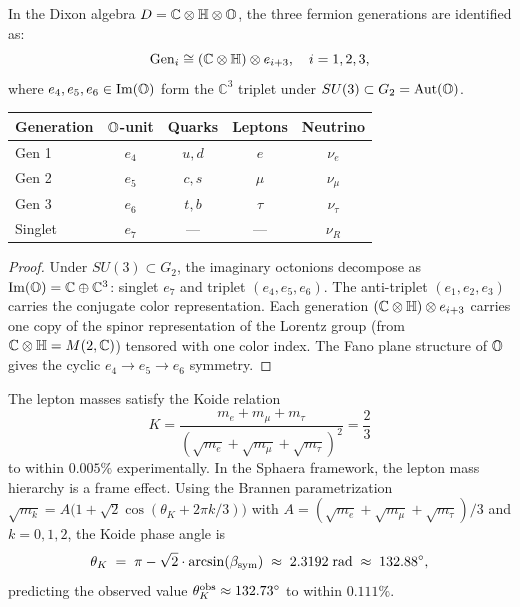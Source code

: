 \begin{theorem}
\label{thm:three-generations}
In the Dixon algebra $D=\mathbb{C}\otimes\mathbb{H}\otimes\mathbb{O}$, the three
fermion generations are identified as:
\[
  \mathrm{Gen}_i \cong (\mathbb{C}\otimes\mathbb{H})\otimes e_{i+3},
  \quad i=1,2,3,
\]
where $e_4,e_5,e_6\in\mathrm{Im}(\mathbb{O})$ form the $\mathbb{C}^3$ triplet
under $SU(3)\subset G_2=\mathrm{Aut}(\mathbb{O})$.
\begin{center}
\renewcommand{\arraystretch}{1.2}
{\small\setlength{\tabcolsep}{4pt}\begin{tabular}{@{}p{}cccc@{}}
\toprule
Generation & $\mathbb{O}$-unit & Quarks & Leptons & Neutrino\\
\midrule
Gen 1 & $e_4$ & $u,d$ & $e$ & $\nu_e$\\
Gen 2 & $e_5$ & $c,s$ & $\mu$ & $\nu_\mu$\\
Gen 3 & $e_6$ & $t,b$ & $\tau$ & $\nu_\tau$\\
Singlet & $e_7$ & --- & --- & $\nu_R$\\
\bottomrule
\end{tabular}}
\end{center}
\end{theorem}

\begin{proof}
Under $SU(3)\subset G_2$, the imaginary octonions decompose as
$\mathrm{Im}(\mathbb{O})=\mathbb{C}\oplus\mathbb{C}^3$: singlet $e_7$ and
triplet $(e_4,e_5,e_6)$.
The anti-triplet $(e_1,e_2,e_3)$ carries the conjugate color
representation.
Each generation $(\mathbb{C}\otimes\mathbb{H})\otimes e_{i+3}$ carries one
copy of the spinor representation of the Lorentz group (from
$\mathbb{C}\otimes\mathbb{H}=M(2,\mathbb{C})$) tensored with one color index.
The Fano plane structure of $\mathbb{O}$ gives the cyclic $e_4\to e_5\to e_6$
symmetry.
\end{proof}

\begin{theorem}
\label{thm:koide-triolic}
The lepton masses satisfy the Koide relation
\[
  K = \frac{m_e+m_\mu+m_\tau}{(\sqrt{m_e}+\sqrt{m_\mu}+\sqrt{m_\tau})^2}
    = \frac{2}{3}
\]
to within $0.005\%$ experimentally.
In the Sphaera framework, the lepton mass hierarchy is a frame effect.
Using the Brannen parametrization
$\sqrt{m_k} = A\bigl(1+\sqrt{2}\cos(\theta_K + 2\pi k/3)\bigr)$
with $A = (\sqrt{m_e}+\sqrt{m_\mu}+\sqrt{m_\tau})/3$
and $k=0,1,2$, the Koide phase angle is
\[
  \theta_K \;=\; \pi - \sqrt{2}\cdot\arcsin(\beta_{\mathrm{sym}}) \;\approx\; 2.3192\;\text{rad}
  \;\approx\; 132.88^\circ,
\]
predicting the observed value $\theta_K^{\rm obs}\approx 132.73^\circ$
to within $0.111\%$.
\end{theorem}

